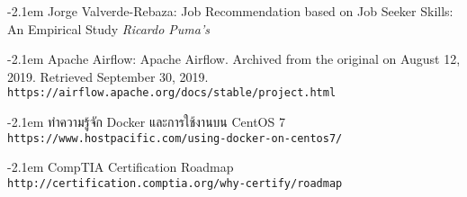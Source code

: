 \documentclass{itkmitlcoop}
\makeatletter
\def\bibindent{2.1em}
\let\old@bibitem\bibitem
\def\bibitem#1{\old@bibitem{#1}\leavevmode\kern-\bibindent}
\makeatother
\begin{document}
\begin{thebibliography}{9}
  Jorge Valverde-Rebaza: Job Recommendation based on Job Seeker Skills: An Empirical Study
  \textit{Ricardo Puma's}

  Apache Airflow: Apache Airflow. Archived from the original on August 12, 2019. Retrieved September 30, 2019.
  \\\texttt{https://airflow.apache.org/docs/stable/project.html}

  ทำความรู้จัก Docker และการใช้งานบน CentOS 7
  \\\texttt{https://www.hostpacific.com/using-docker-on-centos7/}

  CompTIA Certification Roadmap
  \\\texttt{http://certification.comptia.org/why-certify/roadmap}


  \end{thebibliography}

  

\newpage


% 
\end{document}
